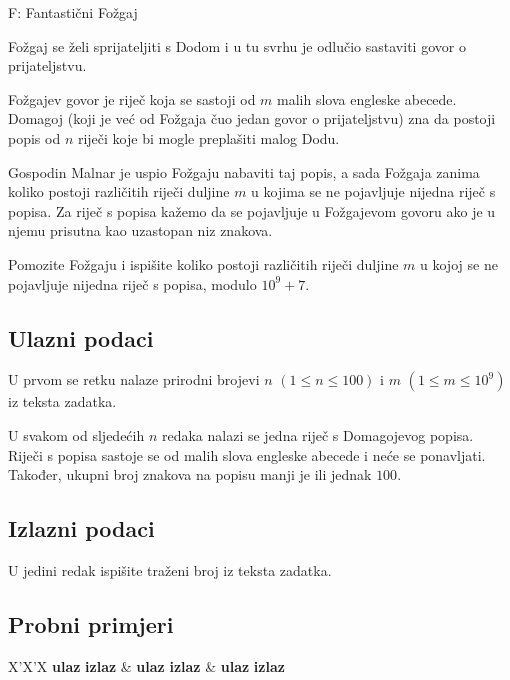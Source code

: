 \begin{statement}[
  timelimit=1 s,
  memorylimit=512 MiB,
]{F: Fantastični Fožgaj}

Fožgaj se želi sprijateljiti s Dodom i u tu svrhu je odlučio sastaviti govor o
prijateljstvu.

Fožgajev govor je riječ koja se sastoji od $m$ malih slova engleske abecede.
Domagoj (koji je već od Fožgaja čuo jedan govor o prijateljstvu) zna da postoji
popis od $n$ riječi koje bi mogle preplašiti malog Dodu.

Gospodin Malnar je uspio Fožgaju nabaviti taj popis, a sada Fožgaja zanima
koliko postoji različitih riječi duljine $m$ u kojima se ne pojavljuje nijedna
riječ s popisa. Za riječ s popisa kažemo da se pojavljuje u Fožgajevom govoru
ako je u njemu prisutna kao uzastopan niz znakova.

Pomozite Fožgaju i ispišite koliko postoji različitih riječi duljine $m$ u kojoj
se ne pojavljuje nijedna riječ s popisa, modulo $10^9 + 7$.


\subsection*{Ulazni podaci}
U prvom se retku nalaze prirodni brojevi $n$ $(1 \le n \le 100)$ i
$m$ $(1 \le m \le 10^9)$ iz teksta zadatka.

U svakom od sljedećih $n$ redaka nalazi se jedna riječ s Domagojevog popisa.
Riječi s popisa sastoje se od malih slova engleske abecede i neće se ponavljati.
Također, ukupni broj znakova na popisu manji je ili jednak $100$.

\subsection*{Izlazni podaci}
U jedini redak ispišite traženi broj iz teksta zadatka.

\subsection*{Probni primjeri}
\begin{tabularx}{\textwidth}{X'X'X}
  \textbf{ulaz}
  \linespread{1}{}
  \textbf{izlaz}
  \linespread{1}{} &
  \textbf{ulaz}
  \linespread{1}{}
  \textbf{izlaz}
  \linespread{1}{} &
  \textbf{ulaz}
  \linespread{1}{}
  \textbf{izlaz}
  \linespread{1}{}
\end{tabularx}

\end{statement}

